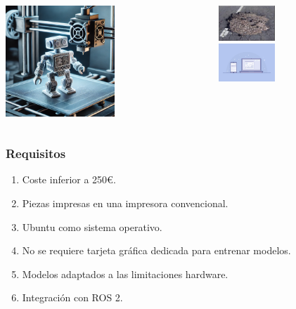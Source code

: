 \documentclass{beamer}
\begin{document}
\begin{frame}
	\begin{center}
	\begin{columns}
		\begin{column}{0.5\textwidth}
			\raggedleft
			\includegraphics[width=0.55\textwidth]{figs/impresion.png} \\[5pt]
		\end{column} \hspace{0.5cm}
		\begin{column}{0.5\textwidth}
			\raggedright
			\includegraphics[width=0.4\textwidth]{figs/bache.png} \\[5pt]
			\includegraphics[width=0.4\textwidth]{figs/interfaceweb.png} \\[5pt]
		\end{column}
	\end{columns}
	\end{center}
\end{frame}


\begin{frame}
\frametitle{Requisitos}
\begin{enumerate}
	\item Coste inferior a 250€.
	\item Piezas impresas en una impresora convencional.
	\item Ubuntu como sistema operativo.
	\item No se requiere tarjeta gráfica dedicada para entrenar modelos.
	\item Modelos adaptados a las limitaciones hardware.
	\item Integración con ROS 2.
\end{enumerate}
\end{frame}
\end{document}
